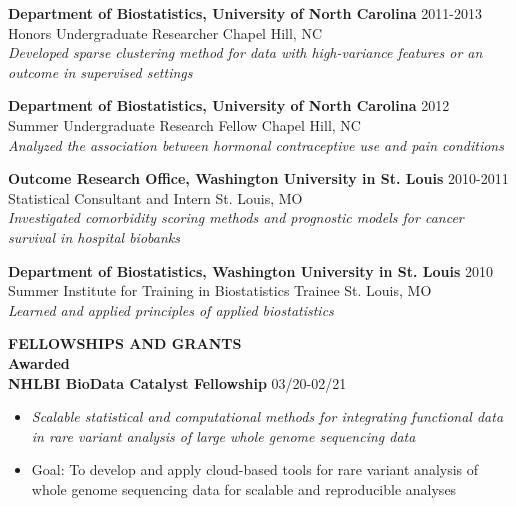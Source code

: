 \documentclass[10pt]{article}
\begin{document}
\textbf{Department of Biostatistics, University of North Carolina} \hfill 2011-2013\\
\indent Honors Undergraduate Researcher \hfill Chapel Hill, NC\\
\indent \textit{Developed sparse clustering method for data with high-variance features or an outcome in supervised settings \\}

\textbf{Department of Biostatistics, University of North Carolina} \hfill 2012\\
\indent Summer Undergraduate Research Fellow \hfill Chapel Hill, NC\\
\indent \textit{Analyzed the association between hormonal contraceptive use and pain conditions \\}

\textbf{Outcome Research Office, Washington University in St. Louis} \hfill 2010-2011\\
\indent Statistical Consultant and Intern \hfill St. Louis, MO\\
\indent \textit{Investigated comorbidity scoring methods and prognostic models for cancer survival in hospital biobanks \\}

\textbf{Department of Biostatistics, Washington University in St. Louis} \hfill 2010\\
\indent Summer Institute for Training in Biostatistics Trainee \hfill St. Louis, MO\\
\indent \textit{Learned and applied principles of applied biostatistics \\}

\vspace{0.25cm}


{\bf FELLOWSHIPS AND GRANTS} \hrulefill \\

\indent \textbf{Awarded} \\

\textbf{NHLBI BioData Catalyst Fellowship} \hfill 03/20-02/21\\
\begin{itemize}
	\item \textit{Scalable statistical and computational methods for integrating functional data in rare variant analysis of large whole genome sequencing data}
	\item Goal: To develop and apply cloud-based tools for rare variant analysis of whole genome sequencing data for scalable and reproducible analyses\\
\end{itemize}
\end{document}
